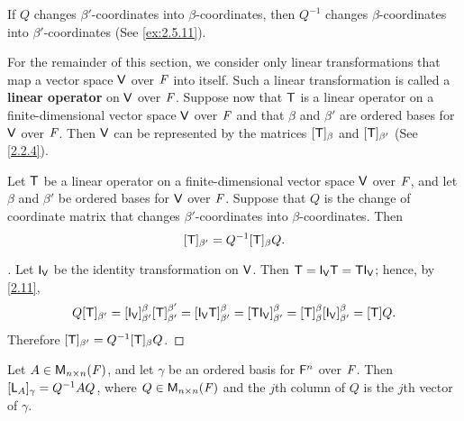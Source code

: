 \begin{note}
  If \(Q\) changes \(\beta'\)-coordinates into \(\beta\)-coordinates, then \(Q^{-1}\) changes \(\beta\)-coordinates into \(\beta'\)-coordinates
  (See \cref{ex:2.5.11}).
\end{note}

\begin{defn}\label{2.5.2}
  For the remainder of this section, we consider only linear transformations that map a vector space \(\mathsf{V}\) over \(\mathit{F}\) into itself.
  Such a linear transformation is called a \textbf{linear operator} on \(\mathsf{V}\) over \(\mathit{F}\).
  Suppose now that \(\mathsf{T}\) is a linear operator on a finite-dimensional vector space \(\mathsf{V}\) over \(\mathit{F}\) and that \(\beta\) and \(\beta'\) are ordered bases for \(\mathsf{V}\) over \(\mathit{F}\).
  Then \(\mathsf{V}\) can be represented by the matrices \([\mathsf{T}]_{\beta}\) and \([\mathsf{T}]_{\beta'}\)
  (See \cref{2.2.4}).
\end{defn}

\begin{thm}\label{2.23}
  Let \(\mathsf{T}\) be a linear operator on a finite-dimensional vector space \(\mathsf{V}\) over \(\mathit{F}\), and let \(\beta\) and \(\beta'\) be ordered bases for \(\mathsf{V}\) over \(\mathit{F}\).
  Suppose that \(Q\) is the change of coordinate matrix that changes \(\beta'\)-coordinates into \(\beta\)-coordinates.
  Then
  \[
    [\mathsf{T}]_{\beta'} = Q^{-1} [\mathsf{T}]_{\beta} Q.
  \]
\end{thm}

\begin{proof}[]
  Let \(\IT[\V]\) be the identity transformation on \(\mathsf{V}\).
  Then \(\T = \IT[\V] \T = \T \IT[\V]\);
  hence, by \cref{2.11},
  \[
    Q [\T]_{\beta'} = [\IT[\V]]_{\beta'}^{\beta} [\T]_{\beta'}^{\beta'} = [\IT[\V] \T]_{\beta'}^{\beta} = [\T \IT[\V]]_{\beta'}^{\beta} = [\T]_{\beta}^{\beta} [\IT[\V]]_{\beta'}^{\beta} = [\T] Q.
  \]
  Therefore \([\mathsf{T}]_{\beta'} = Q^{-1} [\mathsf{T}]_{\beta} Q\).
\end{proof}

\begin{cor}\label{2.5.3}
  Let \(A \in \ms[n][n][\F]\), and let \(\gamma\) be an ordered basis for \(\mathsf{F}^n\) over \(\mathit{F}\).
  Then \([\mathsf{L}_A]_{\gamma} = Q^{-1} A Q\), where \(Q \in \ms[n][n][\F]\) and the \(j\)th column of \(Q\) is the \(j\)th vector of \(\gamma\).
\end{cor}

